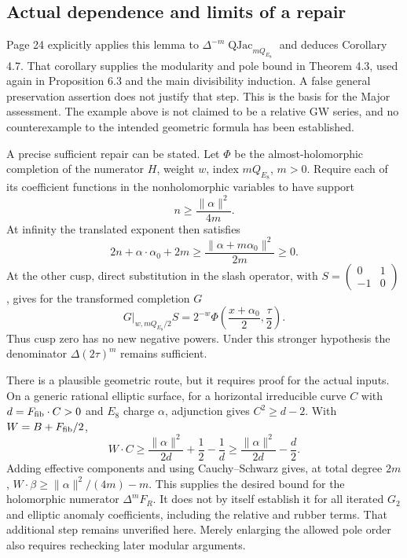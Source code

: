 \documentclass[10pt]{article}
\begin{document}
\subsection*{Actual dependence and limits of a repair}
Page 24 explicitly applies this lemma to \(\Delta^{-m}\mathop{\mathrm{QJac}}_{mQ_{E_8}}\) and deduces Corollary 4.7. That corollary supplies the modularity and pole bound in Theorem 4.3, used again in Proposition 6.3 and the main divisibility induction. A false general preservation assertion does not justify that step. This is the basis for the Major assessment. The example above is not claimed to be a relative GW series, and no counterexample to the intended geometric formula has been established.\par
A precise sufficient repair can be stated. Let \(\Phi\) be the almost-holomorphic completion of the numerator \(H\), weight \(w\), index \(mQ_{E_8}\), \(m>0\). Require each of its coefficient functions in the nonholomorphic variables to have support \[n\ge\frac{\|\alpha\|^2}{4m}.\] At infinity the translated exponent then satisfies \[2n+\alpha\cdot\alpha_0+2m
       \ge\frac{\|\alpha+m\alpha_0\|^2}{2m}\ge0.\] At the other cusp, direct substitution in the slash operator, with \(S=\left(\begin{smallmatrix}0&1\\-1&0\end{smallmatrix}\right)\), gives for the transformed completion \(G\) \[G|_{w,mQ_{E_8}/2}S
     =2^{-w}\Phi\left(\frac{x+\alpha_0}{2},\frac{\tau}{2}\right).\] Thus cusp zero has no new negative powers. Under this stronger hypothesis the denominator \(\Delta(2\tau)^m\) remains sufficient.\par
There is a plausible geometric route, but it requires proof for the actual inputs. On a generic rational elliptic surface, for a horizontal irreducible curve \(C\) with \(d=F_{\rm fib}\cdot C>0\) and \(E_8\) charge \(\alpha\), adjunction gives \(C^2\ge d-2\). With \(W=B+F_{\rm fib}/2\), \[W\cdot C\ge\frac{\|\alpha\|^2}{2d}+\frac12-\frac1d
           \ge\frac{\|\alpha\|^2}{2d}-\frac d2.\] Adding effective components and using Cauchy–Schwarz gives, at total degree \(2m\), \(W\cdot\beta\ge\|\alpha\|^2/(4m)-m\). This supplies the desired bound for the holomorphic numerator \(\Delta^m F_R\). It does not by itself establish it for all iterated \(G_2\) and elliptic anomaly coefficients, including the relative and rubber terms. That additional step remains unverified here. Merely enlarging the allowed pole order also requires rechecking later modular arguments.\par
\end{document}
